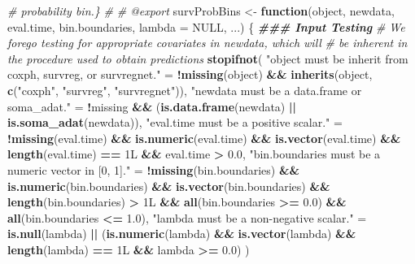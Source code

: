 \documentclass[
]{book}
\newenvironment{Shaded}{\begin{snugshade}}{\end{snugshade}}
\newcommand{\AttributeTok}[1]{\textcolor[rgb]{0.13,0.29,0.53}{#1}}
\newcommand{\CommentTok}[1]{\textcolor[rgb]{0.56,0.35,0.01}{\textit{#1}}}
\newcommand{\ConstantTok}[1]{\textcolor[rgb]{0.56,0.35,0.01}{#1}}
\newcommand{\ControlFlowTok}[1]{\textcolor[rgb]{0.13,0.29,0.53}{\textbf{#1}}}
\newcommand{\DocumentationTok}[1]{\textcolor[rgb]{0.56,0.35,0.01}{\textbf{\textit{#1}}}}
\newcommand{\FloatTok}[1]{\textcolor[rgb]{0.00,0.00,0.81}{#1}}
\newcommand{\FunctionTok}[1]{\textcolor[rgb]{0.13,0.29,0.53}{\textbf{#1}}}
\newcommand{\NormalTok}[1]{#1}
\newcommand{\OtherTok}[1]{\textcolor[rgb]{0.56,0.35,0.01}{#1}}
\newcommand{\SpecialCharTok}[1]{\textcolor[rgb]{0.81,0.36,0.00}{\textbf{#1}}}
\newcommand{\StringTok}[1]{\textcolor[rgb]{0.31,0.60,0.02}{#1}}
\begin{document}
\begin{Shaded}
\begin{Highlighting}[]
\CommentTok{\#\textquotesingle{}   probability bin.\}}
\CommentTok{\#\textquotesingle{} }
\CommentTok{\#\textquotesingle{} @export}
\NormalTok{survProbBins }\OtherTok{\textless{}{-}} \ControlFlowTok{function}\NormalTok{(object, newdata, eval.time, bin.boundaries, }
                         \AttributeTok{lambda =} \ConstantTok{NULL}\NormalTok{, ...) \{ }
  \DocumentationTok{\#\#\# Input Testing}
  \CommentTok{\# We forego testing for appropriate covariates in \textasciigrave{}newdata\textasciigrave{}, which will}
  \CommentTok{\#   be inherent in the procedure used to obtain predictions}
  \FunctionTok{stopifnot}\NormalTok{(}
    \StringTok{"\textasciigrave{}object\textasciigrave{} must be inherit from \textasciigrave{}coxph\textasciigrave{}, \textasciigrave{}survreg\textasciigrave{}, or \textasciigrave{}survregnet\textasciigrave{}."} \OtherTok{=}
      \SpecialCharTok{!}\FunctionTok{missing}\NormalTok{(object) }\SpecialCharTok{\&\&} \FunctionTok{inherits}\NormalTok{(object, }\FunctionTok{c}\NormalTok{(}\StringTok{"coxph"}\NormalTok{, }\StringTok{"survreg"}\NormalTok{, }\StringTok{"survregnet"}\NormalTok{)),}
    \StringTok{"\textasciigrave{}newdata\textasciigrave{} must be a data.frame or soma\_adat."} \OtherTok{=} 
      \SpecialCharTok{!}\NormalTok{missing }\SpecialCharTok{\&\&}\NormalTok{ (}\FunctionTok{is.data.frame}\NormalTok{(newdata) }\SpecialCharTok{||} \FunctionTok{is.soma\_adat}\NormalTok{(newdata)),}
    \StringTok{"\textasciigrave{}eval.time\textasciigrave{} must be a positive scalar."} \OtherTok{=} 
      \SpecialCharTok{!}\FunctionTok{missing}\NormalTok{(eval.time) }\SpecialCharTok{\&\&} \FunctionTok{is.numeric}\NormalTok{(eval.time) }\SpecialCharTok{\&\&} 
      \FunctionTok{is.vector}\NormalTok{(eval.time) }\SpecialCharTok{\&\&} \FunctionTok{length}\NormalTok{(eval.time) }\SpecialCharTok{==}\NormalTok{ 1L }\SpecialCharTok{\&\&}\NormalTok{ eval.time }\SpecialCharTok{\textgreater{}} \FloatTok{0.0}\NormalTok{,}
    \StringTok{"\textasciigrave{}bin.boundaries\textasciigrave{} must be a numeric vector in [0, 1]."} \OtherTok{=} 
      \SpecialCharTok{!}\FunctionTok{missing}\NormalTok{(bin.boundaries) }\SpecialCharTok{\&\&} \FunctionTok{is.numeric}\NormalTok{(bin.boundaries) }\SpecialCharTok{\&\&} 
      \FunctionTok{is.vector}\NormalTok{(bin.boundaries) }\SpecialCharTok{\&\&} \FunctionTok{length}\NormalTok{(bin.boundaries) }\SpecialCharTok{\textgreater{}}\NormalTok{ 1L }\SpecialCharTok{\&\&} 
      \FunctionTok{all}\NormalTok{(bin.boundaries }\SpecialCharTok{\textgreater{}=} \FloatTok{0.0}\NormalTok{) }\SpecialCharTok{\&\&} \FunctionTok{all}\NormalTok{(bin.boundaries }\SpecialCharTok{\textless{}=} \FloatTok{1.0}\NormalTok{),}
    \StringTok{"\textasciigrave{}lambda\textasciigrave{} must be a non{-}negative scalar."} \OtherTok{=} 
      \FunctionTok{is.null}\NormalTok{(lambda) }\SpecialCharTok{||}\NormalTok{ (}\FunctionTok{is.numeric}\NormalTok{(lambda) }\SpecialCharTok{\&\&} \FunctionTok{is.vector}\NormalTok{(lambda) }\SpecialCharTok{\&\&}
                            \FunctionTok{length}\NormalTok{(lambda) }\SpecialCharTok{==}\NormalTok{ 1L }\SpecialCharTok{\&\&}\NormalTok{ lambda }\SpecialCharTok{\textgreater{}=} \FloatTok{0.0}\NormalTok{)}
\NormalTok{  )}
  

\end{Highlighting}
\end{Shaded}
\end{document}
